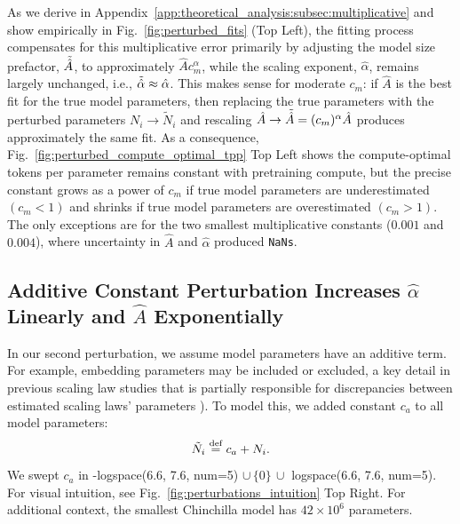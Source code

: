 As we derive in Appendix~\ref{app:theoretical_analysis:subsec:multiplicative} and show empirically in Fig.~\ref{fig:perturbed_fits} (Top Left), the fitting process compensates for this multiplicative error primarily by adjusting the model size prefactor, $\Tilde{\hat{A}}$, to approximately $\hat{A} c_m^{\alpha}$, while the scaling exponent, $\hat{\alpha}$, remains largely unchanged, i.e., $\Tilde{\hat{\alpha}} \approx \hat{\alpha}$.
This makes sense for moderate $c_m$: if $\hat{A}$ is the best fit for the true model parameters, then replacing the true parameters with the perturbed parameters $N_i \rightarrow \tilde{N}_i$ and rescaling $\hat{A} \rightarrow \Tilde{\hat{A}} = (c_m)^{\alpha} \hat{A}$ produces approximately the same fit.
As a consequence, Fig.~\ref{fig:perturbed_compute_optimal_tpp} Top Left shows the compute-optimal tokens per parameter remains constant with pretraining compute, but the precise constant grows as a power of $c_m$ if true model parameters are underestimated $(c_m < 1)$ and shrinks if true model parameters are overestimated $(c_m > 1)$.
The only exceptions are for the two smallest multiplicative constants ($0.001$ and $0.004$), where uncertainty in $\hat{A}$ and $\hat{\alpha}$ produced \texttt{NaNs}.

\subsection{Additive Constant Perturbation Increases $\hat{\alpha}$ Linearly and $\hat{A}$ Exponentially}
\label{sec:robustness_analysis:subsec:additive_constant}

In our second perturbation, we assume model parameters have an additive term. For example, embedding parameters may be included or excluded, a key detail in previous scaling law studies \citep{kaplan2020scaling, hoffman2022chinchilla} that is partially responsible for discrepancies between estimated scaling laws' parameters \citep{pearce2024reconciling, porian2024resolvingdiscrepancies}). To model this, we added constant $c_a$ to all model parameters:
%
\begin{equation}\label{eqn:additive_constant}
    \Tilde{N}_i \operatorname{\stackrel{\text{def}}{\;=\;}} c_a +  N_i .
\end{equation}
%
We swept $c_a$ in -logspace(6.6, 7.6, num=5) $\cup \, \{0\} \, \cup $ logspace(6.6, 7.6, num=5). For visual intuition, see Fig.~\ref{fig:perturbations_intuition} Top Right. For additional context, the smallest Chinchilla model has $42\times10^6$ parameters.

